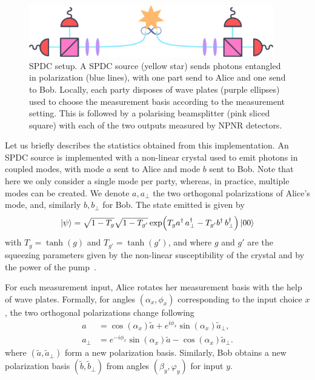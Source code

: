 \begin{figure}[t]
	\begin{center}
		\includegraphics[width=0.95\textwidth]{chapters/deviceindependent/img/spdc.pdf}
	\end{center}
	\caption{SPDC setup. A SPDC source (yellow star) sends photons entangled in polarization (blue lines), with one part send to Alice and one send to Bob.
	Locally, each party disposes of wave plates (purple ellipses) used to choose the measurement basis according to the measurement setting. This is followed by a polarising beamsplitter (pink sliced square) with each of the two outputs measured by NPNR detectors.}
	\label{fig:spdc}
\end{figure}

\medbreak

Let us briefly describes the statistics obtained from this implementation.
An SPDC source is implemented with a non-linear crystal used to emit photons in coupled modes, with mode $a$ sent to Alice and mode $b$ sent to Bob.
Note that here we only consider a single mode per party, whereas, in practice, multiple modes can be created.
We denote $a,a_\perp$ the two orthogonal polarizations of Alice's mode, and, similarly $b,b_\perp$ for Bob.
The state emitted is given by
\begin{equation}
	\ket{\psi} = \sqrt{1-T_g}\sqrt{1-T_{g'}}\exp(T_{g} a^\dag\,a^\dag_\perp - T_{g'}b^\dag\,b_\perp^\dag)\ket{00}
\end{equation}
with $T_g = \tanh(g)$ and $T_{g'} = \tanh(g')$, and where $g$ and $g'$ are the squeezing parameters given by the non-linear susceptibility of the crystal and by the power of the pump~\cite{Vivoli2015b}.

For each measurement input, Alice rotates her measurement basis with the help of wave plates.
Formally, for angles $(\alpha_x,\phi_x)$ corresponding to the input choice $x$, the two orthogonal polarizations change following
\begin{equation}
	\begin{split}
		a &= \cos(\alpha_x)\tilde{a} + e^{i\phi_x}\sin(\alpha_x)\tilde{a}_\perp, \\
		a_\perp &= e^{-i\phi_x}\sin(\alpha_x)\tilde{a}-\cos(\alpha_x)\tilde{a}_\perp.
	\end{split}
\end{equation}
where $(\tilde{a},\tilde{a}_\perp)$ form a new polarization basis.
Similarly, Bob obtains a new polarization basis $(\tilde{b},\tilde{b}_\perp)$ from angles $(\beta_y,\varphi_y)$ for input $y$.

